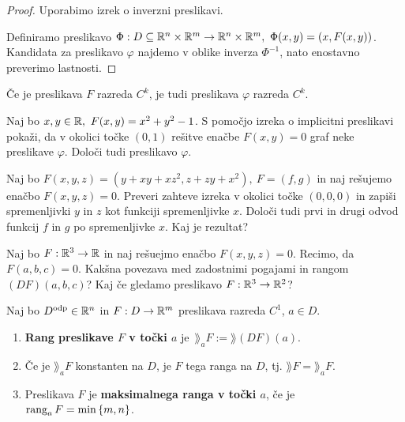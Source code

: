 \begin{proof}
    Uporabimo izrek o inverzni preslikavi. 
    
    Definiramo preslikavo $\Phi: D \subseteq \mathbb{R}^n \times \mathbb{R}^m \to  \mathbb{R}^n \times \mathbb{R}^m, \ \Phi(x,y) = (x, F(x,y))$. Kandidata za preslikavo $\varphi$ najdemo v oblike inverza $\Phi^{-1}$, nato enostavno preverimo lastnosti.
\end{proof}

\begin{posledica}
    Če je preslikava $F$ razreda $C^k$, je tudi preslikava $\varphi$ razreda $C^k$.
\end{posledica}

\begin{zgled}
    Naj bo $x,y \in \mathbb{R}, \ F(x, y) = x^2 + y^2 -1$. S pomočjo izreka o implicitni preslikavi pokaži, da v okolici točke $(0,1)$ rešitve enačbe $F(x,y) = 0$ graf neke preslikave $\varphi$. Določi tudi preslikavo $\varphi$.
\end{zgled}

\begin{zgled}
    Naj bo $F(x,y,z) = (y + xy+xz^2, z+zy+x^2), \ F = (f, g)$ in naj rešujemo enačbo $F(x,y,z) = 0$. Preveri zahteve izreka v okolici točke $(0,0,0)$ in zapiši spremenljivki $y$ in $z$ kot funkciji spremenljivke $x$. Določi tudi prvi in drugi odvod funkcij $f$ in $g$ po spremenljivke $x$. Kaj je rezultat?
\end{zgled}

\begin{zgled}
    Naj bo $F: \mathbb{R}^3 \to \mathbb{R}$ in naj rešuejmo enačbo $F(x,y,z) = 0$. Recimo, da $F(a,b,c) = 0$. Kakšna povezava med zadostnimi pogajami in rangom $(DF)(a,b,c)$? Kaj če gledamo preslikavo $F: \mathbb{R}^3 \to \mathbb{R}^2$?
\end{zgled}

\begin{definicija}
    Naj bo $D^\text{odp} \in \mathbb{R}^n$ in $F: D \to \mathbb{R}^m$ preslikava razreda $C^1$, $a \in D$. 
    \begin{enumerate}
        \item \textbf{Rang preslikave $F$ v točki $a$} je~$\rang_aF := \rang (DF)(a)$.
        \item Če je $\rang_aF$ konstanten na $D$, je $F$ tega ranga na $D$, tj. $\rang F = \rang_aF$.
        \item Preslikava $F$ je \textbf{maksimalnega ranga v točki $a$}, če je $\operatorname{rang}_aF = \min \left\{m, n\right\}$.
    \end{enumerate}      
\end{definicija}

